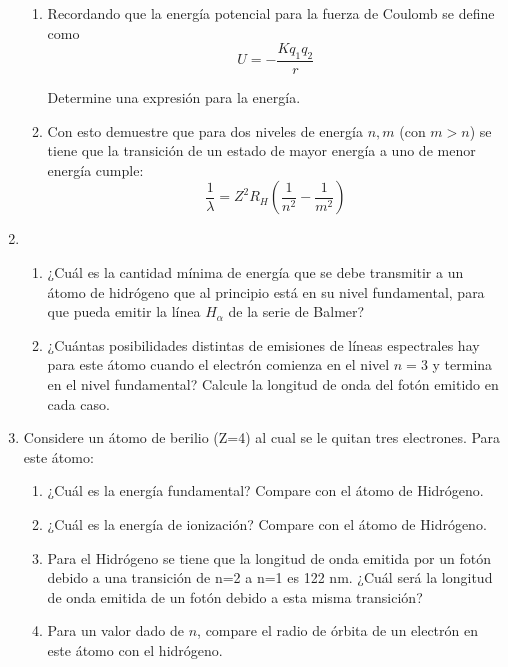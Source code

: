 \documentclass[letterpaper,11pt]{article}
\begin{document}
\begin{enumerate}
\begin{enumerate}
    \item Recordando que la energía potencial para la fuerza de Coulomb se define como
    $$ U = -\frac{Kq_1q_2}{r}$$
    
    Determine una expresión para la energía.
    
    \item Con esto demuestre que para dos niveles de energía $n, m$ (con $m>n$) se tiene que la transición de un estado de mayor energía a uno de menor energía cumple:
    $$\frac{1}{\lambda} = Z^2 R_H\left(\frac{1}{n^2}-\frac{1}{m^2}\right)$$
\end{enumerate}
\item
    \begin{enumerate}
        \item ¿Cuál es la cantidad mínima de energía que se debe transmitir a un átomo de hidrógeno que al principio está en su nivel fundamental, para que pueda emitir la línea $H_{\alpha}$ de la serie de Balmer?
        
        \item ¿Cuántas posibilidades distintas de emisiones de líneas espectrales hay para este átomo cuando el electrón comienza en el nivel $n = 3$ y termina en el nivel fundamental? Calcule la longitud de onda del fotón emitido en cada caso.
    \end{enumerate}

\item Considere un átomo de berilio (Z=4) al cual se le quitan tres electrones. Para este átomo:
\begin{enumerate}
    \item ¿Cuál es la energía fundamental? Compare con el átomo de Hidrógeno.
    \item ¿Cuál es la energía de ionización? Compare con el átomo de Hidrógeno.
    \item Para el Hidrógeno se tiene que la longitud de onda emitida por un fotón debido a una transición de n=2 a n=1 es 122 nm. ¿Cuál será la longitud de onda emitida de un fotón debido a esta misma transición?
    
    \item Para un valor dado de $n$, compare el radio de órbita de un electrón en este átomo con el hidrógeno.
\end{enumerate}
\end{enumerate}
\end{document}
